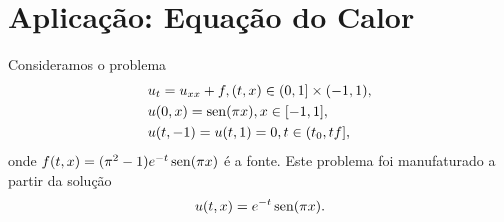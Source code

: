 \section{Aplicação: Equação do Calor}\label{cap_mlp_sec_calor}
\badgeConstrucao

Consideramos o problema
\begin{subequations}\label{cap_mlp_sec_calor:eq:prob}
  \begin{align}
    &u_t = u_{xx} + f, (t,x)\in (0, 1] \times (-1, 1),\\
    &u(0,x) = \operatorname{sen}(\pi x), x\in [-1, 1],\\
    &u(t,-1) = u(t,1) = 0, t\in (t_0, tf],
  \end{align}
\end{subequations}
onde $f(t,x) = (\pi^2 - 1)e^{-t}\operatorname{sen}(\pi x)$ é a fonte. Este problema foi manufaturado a partir da solução
\begin{equation}
  u(t,x) = e^{-t}\operatorname{sen}(\pi x).
\end{equation}

